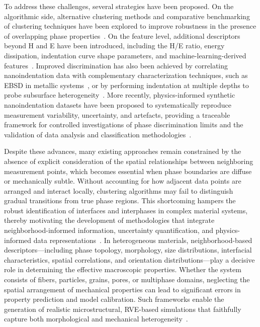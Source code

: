 \documentclass[final,3p,times]{elsarticle}
\begin{document}
To address these challenges, several strategies have been proposed. On the algorithmic side, alternative clustering methods and comparative benchmarking of clustering techniques have been explored to improve robustness in the presence of overlapping phase properties~\cite{alizade_comparative_2024}. On the feature level, additional descriptors beyond H and E have been introduced, including the H/E ratio, energy dissipation, indentation curve shape parameters, and machine-learning-derived features~\cite{jakes_nanoindentation_2009, lu_extraction_2020, kossman_pop-identification_2021, besharatloo_influence_2021, park_deep_2023, trost_explainable_2025}. Improved discrimination has also been achieved by correlating nanoindentation data with complementary characterization techniques, such as EBSD in metallic systems~\cite{bruno_advanced_2024}, or by performing indentation at multiple depths to probe subsurface heterogeneity~\cite{konstantopoulos_classification_2020}. More recently, physics-informed synthetic nanoindentation datasets have been proposed to systematically reproduce measurement variability, uncertainty, and artefacts, providing a traceable framework for controlled investigations of phase discrimination limits and the validation of data analysis and classification methodologies~\cite{maculotti_synthetic_2025}.

Despite these advances, many existing approaches remain constrained by the absence of explicit consideration of the spatial relationships between neighboring measurement points, which becomes essential when phase boundaries are diffuse or mechanically subtle. Without accounting for how adjacent data points are arranged and interact locally, clustering algorithms may fail to distinguish gradual transitions from true phase regions. This shortcoming hampers the robust identification of interfaces and interphases in complex material systems, thereby motivating the development of methodologies that integrate neighborhood-informed information, uncertainty quantification, and physics-informed data representations~\cite{puchi-cabrera_machine_2023}. In heterogeneous materials, neighborhood-based descriptors—including phase topology, morphology, size distributions, interfacial characteristics, spatial correlations, and orientation distributions—play a decisive role in determining the effective macroscopic properties. Whether the system consists of fibers, particles, grains, pores, or multiphase domains, neglecting the spatial arrangement of mechanical properties can lead to significant errors in property prediction and model calibration. Such frameworks enable the generation of realistic microstructural, RVE-based simulations that faithfully capture both morphological and mechanical heterogeneity~\cite{breuer_rve_2020, pardoen_nanomechanics_2021}.
\end{document}
